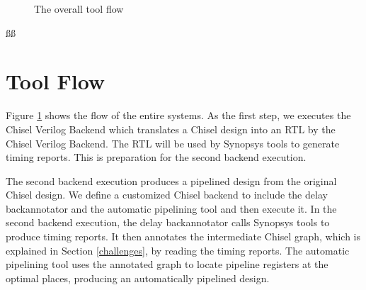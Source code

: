 \begin{figure}
	\centering
    \caption{The overall tool flow}
	\label{toolflow}
\end{figure}
ßß
\section{Tool Flow}
Figure \ref{toolflow} shows the flow of the entire systems. As the first step, we executes the Chisel Verilog Backend which translates a Chisel design into an RTL by the Chisel Verilog Backend. The RTL will be used by Synopsys tools to generate timing reports. This is preparation for the second backend execution.

The second backend execution produces a pipelined design from the original Chisel design. We define a customized Chisel backend to include the delay backannotator and the automatic pipelining tool and then execute it. In the second backend execution, the delay backannotator calls Synopsys tools to produce timing reports. It then annotates the intermediate Chisel graph, which is explained in Section \ref{challenges}, by reading the timing reports. The automatic pipelining tool uses the annotated graph to locate pipeline registers at the optimal places, producing an automatically pipelined design.